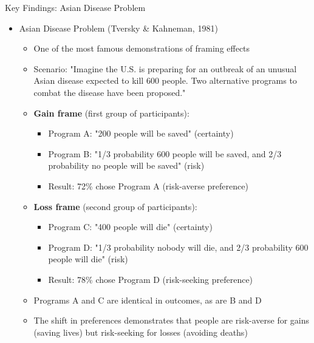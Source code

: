 \documentclass[10pt,handout]{beamer}
\begin{document}
\begin{frame}{Key Findings: Asian Disease Problem}
  \begin{itemize}[<+->]
    \item Asian Disease Problem (Tversky \& Kahneman, 1981)
      \begin{itemize}
        \item One of the most famous demonstrations of framing effects
        \item Scenario: "Imagine the U.S. is preparing for an outbreak of an unusual Asian disease expected to kill 600 people. Two alternative programs to combat the disease have been proposed."
        \item \textbf{Gain frame} (first group of participants):
          \begin{itemize}
            \item Program A: "200 people will be saved" (certainty)
            \item Program B: "1/3 probability 600 people will be saved, and 2/3 probability no people will be saved" (risk)
            \item Result: 72\% chose Program A (risk-averse preference)
          \end{itemize}
        \item \textbf{Loss frame} (second group of participants):
          \begin{itemize}
            \item Program C: "400 people will die" (certainty)
            \item Program D: "1/3 probability nobody will die, and 2/3 probability 600 people will die" (risk)
            \item Result: 78\% chose Program D (risk-seeking preference)
          \end{itemize}
        \item Programs A and C are identical in outcomes, as are B and D
        \item The shift in preferences demonstrates that people are risk-averse for gains (saving lives) but risk-seeking for losses (avoiding deaths)
      \end{itemize}
  \end{itemize}
\end{frame}
\end{document}
